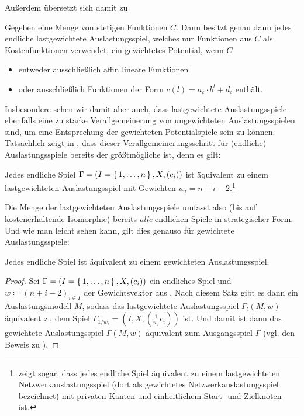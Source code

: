 Außerdem übersetzt sich damit  zu 
\begin{kor}\label{kor:CharExGewPotinLWCG}
	Gegeben eine Menge von stetigen Funktionen $C$. Dann besitzt genau dann jedes endliche lastgewichtete Auslastungsspiel, welches nur Funktionen aus $C$ als Kostenfunktionen verwendet, ein gewichtetes Potential, wenn $C$
	\begin{itemize}
		\item entweder ausschließlich affin lineare Funktionen
		\item oder ausschließlich Funktionen der Form $c(l) = a_c\cdot b^l + d_c$ enthält.
	\end{itemize}
\end{kor}

Insbesondere sehen wir damit aber auch, dass lastgewichtete Auslastungsspiele ebenfalls eine zu starke Verallgemeinerung von ungewichteten Auslastungsspielen sind, um eine Entsprechung der gewichteten Potentialspiele sein zu können. Tatsächlich zeigt \citeauthor{ReprOfFiniteGamesAsNCG} in \cite[Theorem 1]{ReprOfFiniteGamesAsNCG}, dass dieser Verallgemeinerungsschritt für (endliche) Auslastungsspiele bereits der größtmögliche ist, denn es gilt:

\begin{satz}\label{satz:JedesSpielLastGewAusl}
	Jedes endliche Spiel $\Gamma = (I = \set{1, \dots, n}, X, (c_i))$ ist äquivalent zu einem lastgewichteten Auslastungsspiel mit Gewichten $w_i = n + i -2$.\footnote{\citeauthor{ReprOfFiniteGamesAsNCG} zeigt sogar, dass jedes endliche Spiel äquivalent zu einem lastgewichteten Netzwerkauslastungsspiel (dort als \glqq gewichtetes Netzwerkauslastungsspiel\grqq{} bezeichnet) mit privaten Kanten und einheitlichem Start- und Zielknoten ist.}
\end{satz}

Die Menge der lastgewichteten Auslastungsspiele umfasst also (bis auf kostenerhaltende Isomorphie) bereits \emph{alle} endlichen Spiele in strategischer Form. Und wie man leicht sehen kann, gilt dies genauso für gewichtete Auslastungsspiele:

\begin{kor}\label{kor:JedesSpielGewAusl}
	Jedes endliche Spiel ist äquivalent zu einem gewichteten Auslastungsspiel.
\end{kor}

\begin{proof}
	Sei $\Gamma = (I = \set{1, \dots, n}, X, (c_i))$ ein endliches Spiel und $w \coloneqq (n+i-2)_{i \in I}$ der Gewichtsvektor aus . Nach diesem Satz gibt es dann ein Auslastungsmodell $M$, sodass das lastgewichtete Auslastungsspiel $\Gamma_l(M, w)$ äquivalent zu dem Spiel $\Gamma_{1/w_i} = (I, X, (\frac{1}{w_i}c_i))$ ist. Und damit ist dann das gewichtete Auslastungsspiel $\Gamma(M, w)$ äquivalent zum Ausgangsspiel $\Gamma$ (vgl. den Beweis zu ). 
\end{proof}

